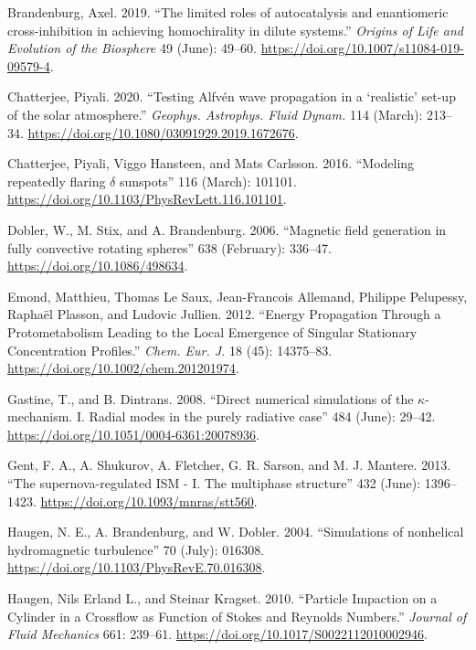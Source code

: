 \documentclass[10pt,a4paper,onecolumn]{article}
\begin{document}
\leavevmode\hypertarget{ref-2019OLEB.49.49B}{}%
Brandenburg, Axel. 2019. ``The limited roles of autocatalysis and
enantiomeric cross-inhibition in achieving homochirality in dilute
systems.'' \emph{Origins of Life and Evolution of the Biosphere} 49
(June): 49--60. \url{https://doi.org/10.1007/s11084-019-09579-4}.

\leavevmode\hypertarget{ref-2020GApFD.114.213C}{}%
Chatterjee, Piyali. 2020. ``Testing Alfvén wave propagation in a
`realistic' set-up of the solar atmosphere.'' \emph{Geophys. Astrophys.
Fluid Dynam.} 114 (March): 213--34.
\url{https://doi.org/10.1080/03091929.2019.1672676}.

\leavevmode\hypertarget{ref-2016PhRvL.116j1101C}{}%
Chatterjee, Piyali, Viggo Hansteen, and Mats Carlsson. 2016. ``Modeling
repeatedly flaring \(\delta\) sunspots'' 116 (March): 101101.
\url{https://doi.org/10.1103/PhysRevLett.116.101101}.

\leavevmode\hypertarget{ref-2006ApJ.638.336D}{}%
Dobler, W., M. Stix, and A. Brandenburg. 2006. ``Magnetic field
generation in fully convective rotating spheres'' 638 (February):
336--47. \url{https://doi.org/10.1086/498634}.

\leavevmode\hypertarget{ref-2012ChemEurJ}{}%
Emond, Matthieu, Thomas Le Saux, Jean-Francois Allemand, Philippe
Pelupessy, Raphaël Plasson, and Ludovic Jullien. 2012. ``Energy
Propagation Through a Protometabolism Leading to the Local Emergence of
Singular Stationary Concentration Profiles.'' \emph{Chem. Eur. J.} 18
(45): 14375--83. \url{https://doi.org/10.1002/chem.201201974}.

\leavevmode\hypertarget{ref-2008Aux5cux26A.484.29G}{}%
Gastine, T., and B. Dintrans. 2008. ``Direct numerical simulations of
the \(\kappa\)-mechanism. I. Radial modes in the purely radiative case''
484 (June): 29--42. \url{https://doi.org/10.1051/0004-6361:20078936}.

\leavevmode\hypertarget{ref-2013MNRAS.432.1396G}{}%
Gent, F. A., A. Shukurov, A. Fletcher, G. R. Sarson, and M. J. Mantere.
2013. ``The supernova-regulated ISM - I. The multiphase structure'' 432
(June): 1396--1423. \url{https://doi.org/10.1093/mnras/stt560}.

\leavevmode\hypertarget{ref-2004PhRvE.70a6308H}{}%
Haugen, N. E., A. Brandenburg, and W. Dobler. 2004. ``Simulations of
nonhelical hydromagnetic turbulence'' 70 (July): 016308.
\url{https://doi.org/10.1103/PhysRevE.70.016308}.

\leavevmode\hypertarget{ref-2010JFM.661a239}{}%
Haugen, Nils Erland L., and Steinar Kragset. 2010. ``Particle Impaction
on a Cylinder in a Crossflow as Function of Stokes and Reynolds
Numbers.'' \emph{Journal of Fluid Mechanics} 661: 239--61.
\url{https://doi.org/10.1017/S0022112010002946}.
\end{document}
